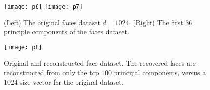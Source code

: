 \documentclass[oneside]{article}
\begin{document}
\begin{figure}[hbtp]
  \centering
  \texttt{[image: p6]}
  \texttt{[image: p7]}
  \caption{(Left) The original faces dataset $d = 1024$. (Right) The
    first $36$ principle components of the faces dataset.}
  \label{fig:five}
\end{figure}

\begin{figure}[hbtp]
  \centering
  \texttt{[image: p8]}
  \caption{Original and reconstructed face dataset. The recovered
    faces are reconstructed from only the top $100$ principal
    components, versus a $1024$ size vector for the original dataset.}
  \label{fig:six}
\end{figure}
\end{document}
